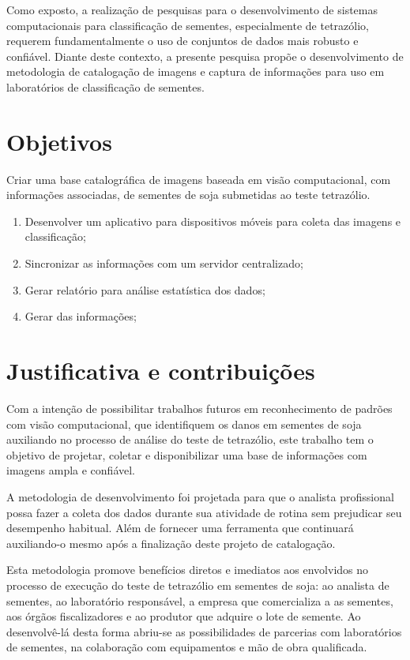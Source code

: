 Como exposto, a realização de pesquisas para o desenvolvimento de sistemas computacionais para classificação de sementes, especialmente de tetrazólio, requerem fundamentalmente o uso de conjuntos de dados mais robusto e confiável. 
Diante deste contexto, a presente pesquisa propõe o desenvolvimento de metodologia de catalogação de imagens e captura de informações  para uso em laboratórios de classificação de sementes.


\section{Objetivos}

Criar uma base catalográfica de imagens baseada em visão computacional, com informações associadas, de sementes de soja submetidas ao teste tetrazólio.


\begin{enumerate}
	\item Desenvolver um aplicativo para dispositivos móveis para coleta das imagens e classificação;
	\item Sincronizar as informações com um servidor centralizado;
	\item Gerar relatório para análise estatística dos dados;
	\item Gerar  das informações;
\end{enumerate}

\section{Justificativa e contribuições}

Com a intenção de possibilitar trabalhos futuros em reconhecimento de padrões com visão computacional, que identifiquem os danos em sementes de soja auxiliando no processo de análise do teste de tetrazólio, este trabalho tem o objetivo de projetar, coletar e disponibilizar uma base de informações com imagens ampla e confiável.

A metodologia de desenvolvimento foi projetada para que o analista profissional possa fazer a coleta dos dados durante sua atividade de rotina sem prejudicar seu desempenho habitual. Além de fornecer uma ferramenta que continuará auxiliando-o mesmo após a finalização deste projeto de catalogação.

Esta metodologia promove benefícios diretos e imediatos aos envolvidos no processo de execução do teste de tetrazólio em sementes de soja: ao analista de sementes, ao laboratório responsável, a empresa que comercializa a as sementes, aos órgãos fiscalizadores e ao produtor que adquire o lote de semente. Ao desenvolvê-lá desta forma abriu-se as possibilidades de parcerias com laboratórios de sementes, na colaboração com equipamentos e mão de obra qualificada.




